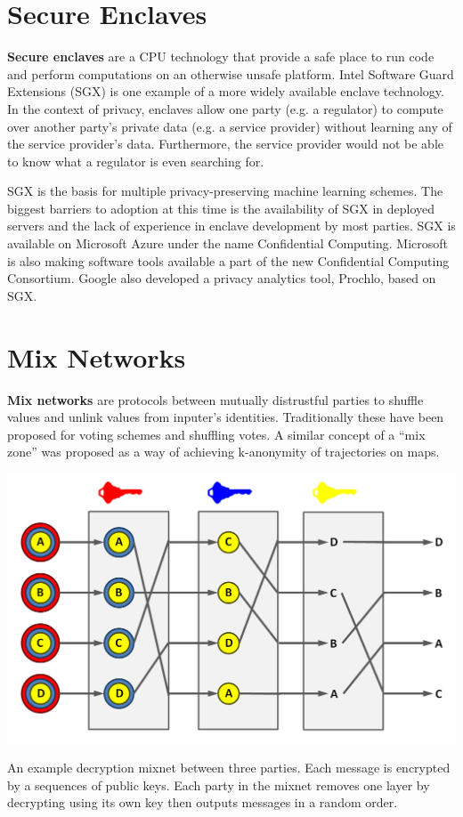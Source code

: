 \documentclass[nobib]{tufte-handout}
\begin{document}
\section{Secure Enclaves}

\textbf{Secure enclaves} are a CPU technology that provide a safe place to run
code and perform computations on an otherwise unsafe platform. Intel Software
Guard Extensions (SGX) \cite{intel-sgx} is one example of a more widely available enclave
technology. In the context of privacy, enclaves allow one party (e.g. a
regulator) to compute over another party’s private data (e.g. a service
provider) without learning any of the service provider’s data. Furthermore, the
service provider would not be able to know what a regulator is even searching
for.

SGX is the basis for multiple privacy-preserving machine learning schemes. The
biggest barriers to adoption at this time is the availability of SGX in deployed
servers and the lack of experience in enclave development by most parties. SGX
is available on Microsoft Azure under the name Confidential Computing. Microsoft
is also making software tools available a part of the new Confidential Computing
Consortium. Google also developed a privacy analytics tool, Prochlo, based on
SGX.

\section{Mix Networks}

\textbf{Mix networks} are protocols between mutually distrustful parties to
shuffle values and unlink values from inputer’s identities. Traditionally these
have been proposed for voting schemes and shuffling votes. A similar concept of
a “mix zone” was proposed as a way of achieving k-anonymity of trajectories on
maps.

\begin{marginfigure} \includegraphics[width=\linewidth]{mixnet} \caption{An
example decryption mixnet between three parties. Each message is encrypted by a
sequences of public keys. Each party in the mixnet removes one layer by
decrypting using its own key then outputs messages in a random order.}
\label{fig:mixnet} \end{marginfigure}
\end{document}
